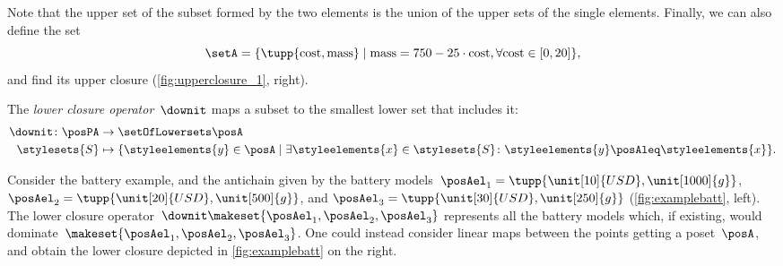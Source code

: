 
Note that the upper set of the subset formed by the two elements is the union of the upper sets of the single elements.
%
Finally, we can also define the set
%
\begin{equation}
    \setA=\{
    \tupp{\text{cost},\text{mass}}\mid \text{mass}=750-25\cdot \text{cost},
    \forall \text{cost} \in [0,20]
    \},
\end{equation}
%
and find its upper closure (\cref{fig:upperclosure_1}, right).
%
\begin{figure*}[h!]
    \centering
    \hfill
    \hfill
    \caption{Example of uppler closure for different sets of battery choices.}
    \label{fig:upperclosure_1}
\end{figure*}

\begin{definition}
    \label{def:lowerclosure}
    The \emph{lower closure operator}~$\downit$ maps a subset to the smallest lower set that includes it:
    \begin{equation*}
        \begin{aligned}
            \downit \colon \posPA & \to \setOfLowersets   \posA                                                                                                                 \\
            \stylesets{S}         & \mapsto \{ \styleelements{y}\in \posA \mid \exists \styleelements{x}\in \stylesets{S} \colon \styleelements{y}\posAleq \styleelements{x}\}.
        \end{aligned}
    \end{equation*}
\end{definition}

Consider the battery example, and the antichain given by the battery models~$\posAel_1=\tupp{\unit[10]{USD},\unit[1000]{g}}$, $\posAel_2=\tupp{\unit[20]{USD},\unit[500]{g}}$, and $\posAel_3=\tupp{\unit[30]{USD},\unit[250]{g}}$ (\cref{fig:examplebatt}, left).
The lower closure operator~$\downit\makeset{\posAel_1,\posAel_2,\posAel_3}$ represents all the battery models which, if existing, would dominate~$\makeset{\posAel_1,\posAel_2,\posAel_3}$.
One could instead consider linear maps between the points getting a poset~$\posA$, and obtain the lower closure depicted in \cref{fig:examplebatt} on the right.

